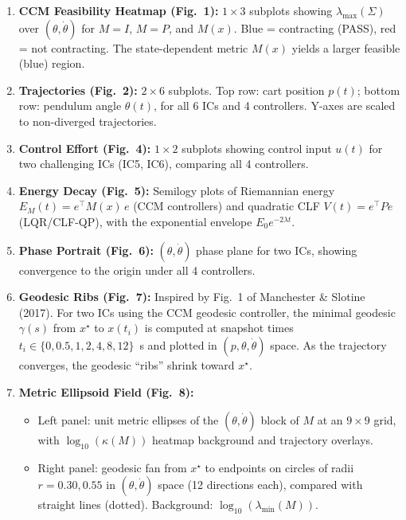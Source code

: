 \documentclass[11pt,a4paper]{article}
\begin{document}
\begin{enumerate}[leftmargin=2em]
    \item \textbf{CCM Feasibility Heatmap (Fig.~1):} \(1 \times 3\) subplots showing \(\lambda_{\max}(\Sigma)\) over \((\theta, \dot\theta)\) for \(M = I\), \(M = P\), and \(M(x)\).  Blue = contracting (PASS), red = not contracting.  The state-dependent metric \(M(x)\) yields a larger feasible (blue) region.

    \item \textbf{Trajectories (Fig.~2):} \(2 \times 6\) subplots.  Top row: cart position \(p(t)\); bottom row: pendulum angle \(\theta(t)\), for all 6 ICs and 4 controllers.  Y-axes are scaled to non-diverged trajectories.

    \item \textbf{Control Effort (Fig.~4):} \(1 \times 2\) subplots showing control input \(u(t)\) for two challenging ICs (IC5, IC6), comparing all 4 controllers.

    \item \textbf{Energy Decay (Fig.~5):} Semilogy plots of Riemannian energy \(E_M(t) = e^\top M(x)\, e\) (CCM controllers) and quadratic CLF \(V(t) = e^\top P e\) (LQR/CLF-QP), with the exponential envelope \(E_0 e^{-2\lambda t}\).

    \item \textbf{Phase Portrait (Fig.~6):} \((\theta, \dot\theta)\) phase plane for two ICs, showing convergence to the origin under all 4 controllers.

    \item \textbf{Geodesic Ribs (Fig.~7):} Inspired by Fig.~1 of Manchester \& Slotine (2017).  For two ICs using the CCM geodesic controller, the minimal geodesic \(\gamma(s)\) from \(x^\star\) to \(x(t_i)\) is computed at snapshot times \(t_i \in \{0, 0.5, 1, 2, 4, 8, 12\}\)~s and plotted in \((p, \theta, \dot\theta)\) space.  As the trajectory converges, the geodesic ``ribs'' shrink toward \(x^\star\).

    \item \textbf{Metric Ellipsoid Field (Fig.~8):}
    \begin{itemize}
        \item Left panel: unit metric ellipses of the \((\theta, \dot\theta)\) block of \(M\) at an \(9 \times 9\) grid, with \(\log_{10}(\kappa(M))\) heatmap background and trajectory overlays.
        \item Right panel: geodesic fan from \(x^\star\) to endpoints on circles of radii \(r = 0.30, 0.55\) in \((\theta, \dot\theta)\) space (12 directions each), compared with straight lines (dotted).  Background: \(\log_{10}(\lambda_{\min}(M))\).
    \end{itemize}


\end{enumerate}
\end{document}
